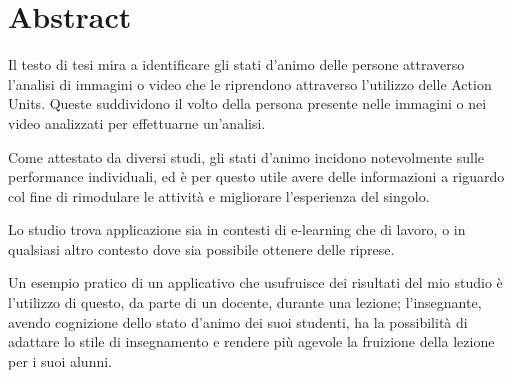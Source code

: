 \chapter*{Abstract}

Il testo di tesi mira a identificare gli stati d’animo delle persone attraverso l’analisi di immagini o video che le riprendono attraverso l'utilizzo delle Action Units.
Queste suddividono il volto della persona presente nelle immagini o nei video analizzati per effettuarne un'analisi.

Come attestato da diversi studi, gli stati d’animo incidono notevolmente sulle performance individuali, ed è per questo utile avere delle informazioni a riguardo col fine di rimodulare le attività e migliorare l’esperienza del singolo.

Lo studio trova applicazione sia in contesti di e-learning che di lavoro, o in qualsiasi altro contesto dove sia possibile ottenere delle riprese.

Un esempio pratico di un applicativo che usufruisce dei risultati del mio studio è l’utilizzo di questo, da parte di un docente, durante una lezione; l’insegnante, avendo cognizione dello stato d’animo dei suoi studenti, ha la possibilità di adattare lo stile di insegnamento e rendere più agevole la fruizione della lezione per i suoi alunni.